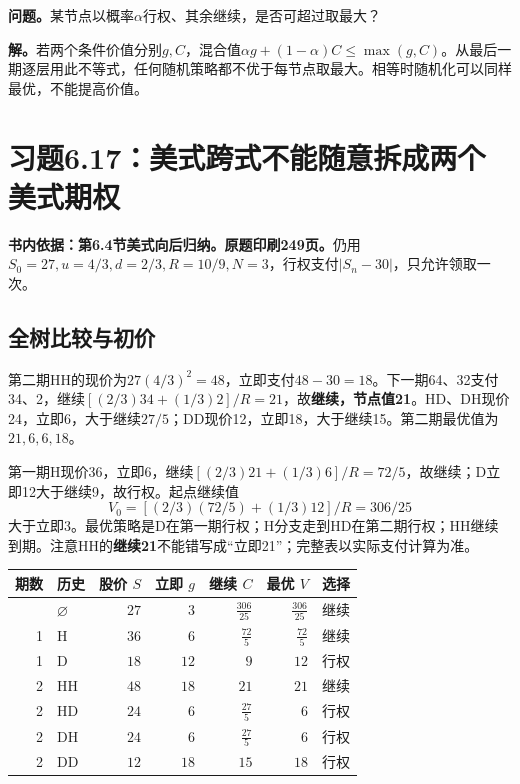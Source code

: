 \documentclass[11pt,a4paper,UTF8,fontset=fandol]{ctexart}
\begin{document}
\textbf{问题。}某节点以概率\(\alpha\)行权、其余继续，是否可超过取最大？

\textbf{解。}若两个条件价值分别\(g,C\)，混合值\(\alpha g+(1-\alpha)C\le\max(g,C)\)。从最后一期逐层用此不等式，任何随机策略都不优于每节点取最大。相等时随机化可以同样最优，不能提高价值。

\bigskip

\section{习题6.17：美式跨式不能随意拆成两个美式期权}\label{ux4e60ux98986.17ux7f8eux5f0fux8de8ux5f0fux4e0dux80fdux968fux610fux62c6ux6210ux4e24ux4e2aux7f8eux5f0fux671fux6743}

\textbf{书内依据：第6.4节美式向后归纳。原题印刷249页。}仍用\(S_0=27,u=4/3,d=2/3,R=10/9,N=3\)，行权支付\(|S_n-30|\)，只允许领取一次。

\subsection{全树比较与初价}\label{ux5168ux6811ux6bd4ux8f83ux4e0eux521dux4ef7}

第二期HH的现价为\(27(4/3)^2=48\)，立即支付\(48-30=18\)。下一期64、32支付34、2，继续\([(2/3)34+(1/3)2]/R=21\)，故\textbf{继续，节点值21}。HD、DH现价24，立即6，大于继续\(27/5\)；DD现价12，立即18，大于继续15。第二期最优值为\(21,6,6,18\)。

第一期H现价36，立即6，继续\([(2/3)21+(1/3)6]/R=72/5\)，故继续；D立即12大于继续9，故行权。起点继续值
\[\boxed{V_0=[(2/3)(72/5)+(1/3)12]/R=306/25}\]
大于立即3。最优策略是D在第一期行权；H分支走到HD在第二期行权；HH继续到期。注意HH的\textbf{继续21}不能错写成``立即21''；完整表以实际支付计算为准。

\begingroup
\small
\setlength{\tabcolsep}{4pt}
\renewcommand{\arraystretch}{1.10}

\begin{longtable}[]{@{}rlrrrrl@{}}
\toprule\noalign{}
期数 & 历史 & 股价 \(S\) & 立即 \(g\) & 继续 \(C\) & 最优 \(V\) &
选择 \\
\midrule\noalign{}
\endhead
\bottomrule\noalign{}
\endlastfoot
0 & \(\varnothing\) & \(27\) & \(3\) & \(\frac{306}{25}\) &
\(\frac{306}{25}\) & 继续 \\
1 & H & \(36\) & \(6\) & \(\frac{72}{5}\) & \(\frac{72}{5}\) & 继续 \\
1 & D & \(18\) & \(12\) & \(9\) & \(12\) & 行权 \\
2 & HH & \(48\) & \(18\) & \(21\) & \(21\) & 继续 \\
2 & HD & \(24\) & \(6\) & \(\frac{27}{5}\) & \(6\) & 行权 \\
2 & DH & \(24\) & \(6\) & \(\frac{27}{5}\) & \(6\) & 行权 \\
2 & DD & \(12\) & \(18\) & \(15\) & \(18\) & 行权 \\
\end{longtable}
\end{document}
